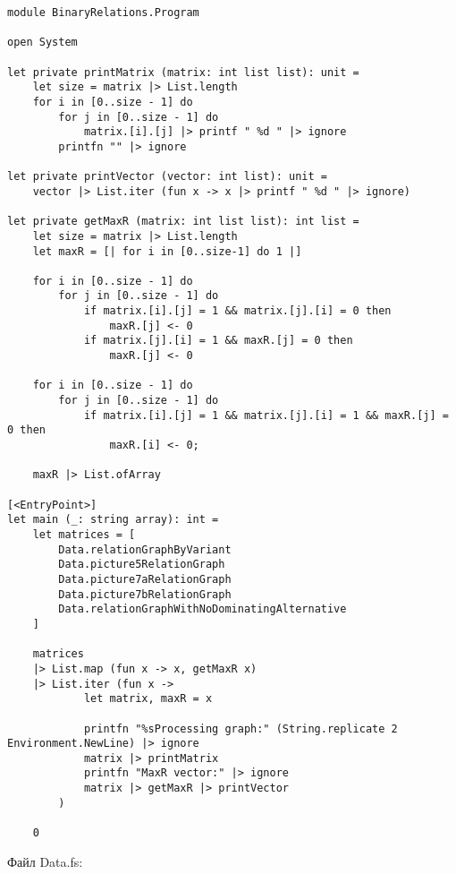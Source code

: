 \documentclass[a4paper,14pt]{extarticle}
\begin{document}
\begin{lstlisting}
module BinaryRelations.Program

open System

let private printMatrix (matrix: int list list): unit =
    let size = matrix |> List.length
    for i in [0..size - 1] do
        for j in [0..size - 1] do
            matrix.[i].[j] |> printf " %d " |> ignore
        printfn "" |> ignore

let private printVector (vector: int list): unit =
    vector |> List.iter (fun x -> x |> printf " %d " |> ignore)

let private getMaxR (matrix: int list list): int list =
    let size = matrix |> List.length
    let maxR = [| for i in [0..size-1] do 1 |]

    for i in [0..size - 1] do
        for j in [0..size - 1] do
            if matrix.[i].[j] = 1 && matrix.[j].[i] = 0 then
                maxR.[j] <- 0
            if matrix.[j].[i] = 1 && maxR.[j] = 0 then
                maxR.[j] <- 0

    for i in [0..size - 1] do
        for j in [0..size - 1] do
            if matrix.[i].[j] = 1 && matrix.[j].[i] = 1 && maxR.[j] = 0 then
                maxR.[i] <- 0;

    maxR |> List.ofArray

[<EntryPoint>]
let main (_: string array): int =
    let matrices = [
        Data.relationGraphByVariant
        Data.picture5RelationGraph
        Data.picture7aRelationGraph
        Data.picture7bRelationGraph
        Data.relationGraphWithNoDominatingAlternative
    ]

    matrices
    |> List.map (fun x -> x, getMaxR x)
    |> List.iter (fun x ->
            let matrix, maxR = x

            printfn "%sProcessing graph:" (String.replicate 2 Environment.NewLine) |> ignore
            matrix |> printMatrix
            printfn "MaxR vector:" |> ignore
            matrix |> getMaxR |> printVector
        )

    0
\end{lstlisting}

Файл Data.fs:
\end{document}
